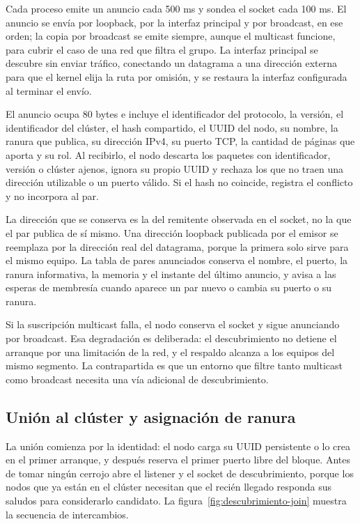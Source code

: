Cada proceso emite un anuncio cada 500 ms y sondea el socket cada 100 ms. El anuncio se envía por loopback, por la interfaz principal y por broadcast, en ese orden; la copia por broadcast se emite siempre, aunque el multicast funcione, para cubrir el caso de una red que filtra el grupo. La interfaz principal se descubre sin enviar tráfico, conectando un datagrama a una dirección externa para que el kernel elija la ruta por omisión, y se restaura la interfaz configurada al terminar el envío.

El anuncio ocupa 80 bytes e incluye el identificador del protocolo, la versión, el identificador del clúster, el hash compartido, el UUID del nodo, su nombre, la ranura que publica, su dirección IPv4, su puerto TCP, la cantidad de páginas que aporta y su rol. Al recibirlo, el nodo descarta los paquetes con identificador, versión o clúster ajenos, ignora su propio UUID y rechaza los que no traen una dirección utilizable o un puerto válido. Si el hash no coincide, registra el conflicto y no incorpora al par.

La dirección que se conserva es la del remitente observada en el socket, no la que el par publica de sí mismo. Una dirección loopback publicada por el emisor se reemplaza por la dirección real del datagrama, porque la primera solo sirve para el mismo equipo. La tabla de pares anunciados conserva el nombre, el puerto, la ranura informativa, la memoria y el instante del último anuncio, y avisa a las esperas de membresía cuando aparece un par nuevo o cambia su puerto o su ranura.

Si la suscripción multicast falla, el nodo conserva el socket y sigue anunciando por broadcast. Esa degradación es deliberada: el descubrimiento no detiene el arranque por una limitación de la red, y el respaldo alcanza a los equipos del mismo segmento. La contrapartida es que un entorno que filtre tanto multicast como broadcast necesita una vía adicional de descubrimiento.

\subsection{Unión al clúster y asignación de ranura}

La unión comienza por la identidad: el nodo carga su UUID persistente o lo crea en el primer arranque, y después reserva el primer puerto libre del bloque. Antes de tomar ningún cerrojo abre el listener y el socket de descubrimiento, porque los nodos que ya están en el clúster necesitan que el recién llegado responda sus saludos para considerarlo candidato. La figura~\ref{fig:descubrimiento-join} muestra la secuencia de intercambios.

